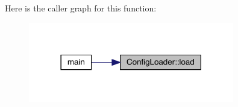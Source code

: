 Here is the caller graph for this function\+:
\nopagebreak
\begin{figure}[H]
\begin{center}
\leavevmode
\includegraphics[width=254pt]{namespace_config_loader_a26cf01adba9411ef1fa006d5068d7cc4_icgraph}
\end{center}
\end{figure}
